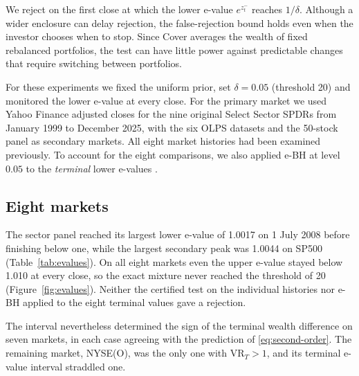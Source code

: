 \documentclass{article}
\numberwithin{equation}{section}
\theoremstyle{remark}
\begin{document}
We reject on the first close at which the lower e-value
$e^{z_t^-}$ reaches $1/\delta$. Although a wider enclosure can delay
rejection, the false-rejection bound holds even when the investor
chooses when to stop. Since Cover averages the wealth of fixed
rebalanced portfolios, the test can have little power against
predictable changes that require switching between portfolios.

For these experiments we fixed the uniform prior, set $\delta=0.05$
(threshold 20) and monitored the lower e-value at every close. For the
primary market we used Yahoo Finance adjusted closes
\citep{yahooprices,yfinance} for the nine original Select
Sector SPDRs from January 1999 to December 2025, with the six OLPS datasets
and the 50-stock panel as secondary markets. All eight market histories
had been examined previously. To account for the eight comparisons, we also applied e-BH at
level $0.05$ to the \emph{terminal} lower e-values \citep{wang2022false}.

\subsection{Eight markets}
The sector panel reached its largest lower e-value of 1.0017 on
1 July 2008 before finishing below one, while the largest secondary
peak was 1.0044 on SP500 (Table~\ref{tab:evalues}). On all eight
markets even the upper e-value stayed below 1.010 at every close, so
the exact mixture never reached the threshold of 20
(Figure~\ref{fig:evalues}). Neither the certified test on the individual histories nor e-BH
applied to the eight terminal values gave a rejection.

The interval nevertheless determined the sign of the terminal wealth difference on seven markets,
in each case agreeing with the prediction of \eqref{eq:second-order}.
The remaining market, NYSE(O), was the only one with $\mathrm{VR}_T>1$,
and its terminal e-value interval straddled one.
\end{document}
